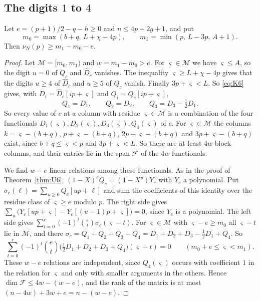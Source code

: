 \subsection{The digits $1$ to $4$}
\begin{theorem}\label{thm:S}
Let $e=(p+1)/2-q-h\ge0$ and $n\le4p+2g+1$, and put
\[
 m_0=\max(b+q,\,L+\chi-4p),\qquad m_1=\min(p,\,L-3p,\,A+1).
\]
Then $\nu_N(p)\ge m_1-m_0-e$.
\end{theorem}

\begin{proof}
Let $\mathcal M=[m_0,m_1)$ and $w=m_1-m_0>e$. For $\varsigma\in \mathcal M$ we have $\varsigma\le A$, so the digit $u=0$ of $Q_c$ and
$\widehat D_c$ vanishes. The inequality $\varsigma\ge L+\chi-4p$ gives that the digits $u\ge4$ of $\widehat D_c$ and
$u\ge5$ of $Q_c$ vanish. Finally $3p+\varsigma<L$. So \eqref{eq:K6} gives, with $D_i=\widehat D_c[ip+\varsigma]$ and
$Q_i=Q_c[ip+\varsigma]$,
\[
 Q_1=D_1,\qquad Q_2=D_2,\qquad Q_3=D_3-\tfrac12D_1 .
\]
So every value of $c$ at a column with residue $\varsigma\in \mathcal M$ is a combination of the four functionals
$D_1(\varsigma),D_2(\varsigma),D_3(\varsigma),Q_4(\varsigma)$ of $c$. For $\varsigma\in \mathcal M$ the columns $k=\varsigma-(b+q)$, $p+\varsigma-(b+q)$,
$2p+\varsigma-(b+q)$ and $3p+\varsigma-(b+q)$ exist, since $b+q\le\varsigma<p$ and $3p+\varsigma<L$. So there are at least $4w$
block columns, and their entries lie in the span $\mathcal F$ of the $4w$ functionals.

We find $w-e$ linear relations among these functionals. As in the proof of Theorem~\ref{thm:U6},
$(1-X)^eQ_c=(1-X^p)Y_c$ with $Y_c$ a polynomial. Put $\sigma_c(\ell)=\sum_{u\ge0}Q_c[up+\ell]$ and sum the
coefficients of this identity over the residue class of $\varsigma\ge e$ modulo $p$. The right side gives
$\sum_u\bigl(Y_c[up+\varsigma]-Y_c[(u-1)p+\varsigma]\bigr)=0$, since $Y_c$ is a polynomial. The left side gives
$\sum_{t=0}^e(-1)^t\binom et\sigma_c(\varsigma-t)$. For $\varsigma\in \mathcal M$ with $\varsigma-e\ge m_0$ all $\varsigma-t$ lie in $\mathcal M$, and there
$\sigma_c=Q_1+Q_2+Q_3+Q_4=D_1+D_2+D_3-\tfrac12D_1+Q_4$. So
\[
 \sum_{t=0}^e(-1)^t\binom et\bigl(\tfrac12D_1+D_2+D_3+Q_4\bigr)(\varsigma-t)=0\qquad(m_0+e\le\varsigma<m_1).
\]
These $w-e$ relations are independent, since $Q_4(\varsigma)$ occurs with coefficient $1$ in the relation for $\varsigma$
and only with smaller arguments in the others. Hence $\dim \mathcal F\le4w-(w-e)$, and the rank of the matrix is at
most $(n-4w)+3w+e=n-(w-e)$.
\end{proof}


